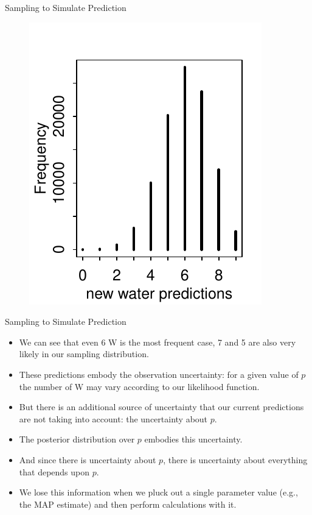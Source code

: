 \documentclass[handout]{beamer}
\begin{document}
\begin{frame}{Sampling to Simulate Prediction}
\scriptsize{

   \begin{figure}[h!]
	\centering
	\includegraphics{pics/w_predictions.pdf}
	\end{figure} 




} 

\end{frame}


\begin{frame}{Sampling to Simulate Prediction}
\scriptsize{

\begin{itemize}

\item We can see that even 6 W is the most frequent case, 7 and 5 are also very likely in our sampling distribution.

\item These predictions embody the observation uncertainty: for a given value of $p$ the number of W may vary according to our likelihood function.

\item But there is an additional source of uncertainty that our current predictions are not taking into account: the uncertainty about $p$.

\item The posterior distribution over $p$ embodies this uncertainty.

\item And since there is uncertainty about $p$, there is uncertainty about everything that depends upon $p$.

\item We lose this information when we pluck out a single parameter value (e.g., the MAP estimate) and then perform calculations with it. 


\end{itemize}


} 
\end{frame}
\end{document}
